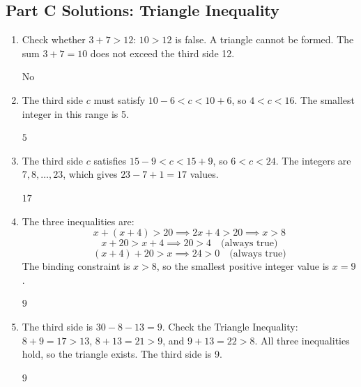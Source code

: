 \documentclass[14pt]{extarticle}
\begin{document}
\subsection*{Part C Solutions: Triangle Inequality}
\begin{enumerate}
  \item Check whether \(3 + 7 > 12\): \(10 > 12\) is false. A triangle cannot be formed. The sum \(3 + 7 = 10\) does not exceed the third side 12.

  \(\boxed{\text{No}}\)

  \item The third side \(c\) must satisfy \(10 - 6 < c < 10 + 6\), so \(4 < c < 16\). The smallest integer in this range is 5.

  \(\boxed{5}\)

  \item The third side \(c\) satisfies \(15 - 9 < c < 15 + 9\), so \(6 < c < 24\). The integers are \(7, 8, \ldots, 23\), which gives \(23 - 7 + 1 = 17\) values.

  \(\boxed{17}\)

  \item The three inequalities are:
  \[
  x + (x + 4) > 20 \implies 2x + 4 > 20 \implies x > 8
  \]
  \[
  x + 20 > x + 4 \implies 20 > 4 \quad \text{(always true)}
  \]
  \[
  (x + 4) + 20 > x \implies 24 > 0 \quad \text{(always true)}
  \]
  The binding constraint is \(x > 8\), so the smallest positive integer value is \(x = 9\).

  \(\boxed{9}\)

  \item The third side is \(30 - 8 - 13 = 9\). Check the Triangle Inequality: \(8 + 9 = 17 > 13\), \(8 + 13 = 21 > 9\), and \(9 + 13 = 22 > 8\). All three inequalities hold, so the triangle exists. The third side is 9.

  \(\boxed{9}\)
\end{enumerate}
\end{document}
